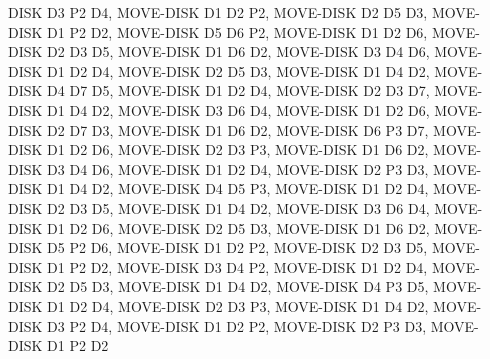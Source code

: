 \documentclass[12pt]{article}
\begin{document}
\begin{appendix}
\begin{itemize}
DISK D3 P2 D4,  MOVE-DISK D1 D2 P2,  MOVE-DISK D2 D5 D3,  MOVE-DISK D1 P2 D2,  MOVE-DISK D5 D6 P2,  MOVE-DISK D1 D2 D6,  MOVE-DISK D2 D3 D5,  MOVE-DISK D1 D6 D2,  MOVE-DISK D3 D4 D6,  MOVE-DISK D1 D2 D4,  MOVE-DISK D2 D5 D3,  MOVE-DISK D1 D4 D2,  MOVE-DISK D4 D7 D5,  MOVE-DISK D1 D2 D4,  MOVE-DISK D2 D3 D7,  MOVE-DISK D1 D4 D2,  MOVE-DISK D3 D6 D4,  MOVE-DISK D1 D2 D6,  MOVE-DISK D2 D7 D3,  MOVE-DISK D1 D6 D2,  MOVE-DISK D6 P3 D7,  MOVE-DISK D1 D2 D6,  MOVE-DISK D2 D3 P3,  MOVE-DISK D1 D6 D2,  MOVE-DISK D3 D4 D6,  MOVE-DISK D1 D2 D4,  MOVE-DISK D2 P3 D3,  MOVE-DISK D1 D4 D2,  MOVE-DISK D4 D5 P3,  MOVE-DISK D1 D2 D4,  MOVE-DISK D2 D3 D5,  MOVE-DISK D1 D4 D2,  MOVE-DISK D3 D6 D4,  MOVE-DISK D1 D2 D6,  MOVE-DISK D2 D5 D3,  MOVE-DISK D1 D6 D2,  MOVE-DISK D5 P2 D6,  MOVE-DISK D1 D2 P2,  MOVE-DISK D2 D3 D5,  MOVE-DISK D1 P2 D2,  MOVE-DISK D3 D4 P2,  MOVE-DISK D1 D2 D4,  MOVE-DISK D2 D5 D3,  MOVE-DISK D1 D4 D2,  MOVE-DISK D4 P3 D5,  MOVE-DISK D1 D2 D4,  MOVE-DISK D2 D3 P3,  MOVE-DISK D1 D4 D2,  MOVE-DISK D3 P2 D4,  
MOVE-DISK D1 D2 P2,  MOVE-DISK D2 P3 D3,  MOVE-DISK D1 P2 D2
  
  \end{itemize}

\end{appendix}

\newpage
\end{document}
